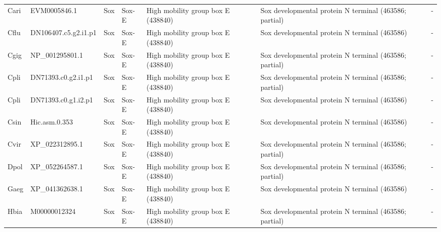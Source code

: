 \documentclass[../main.tex]{subfiles}
\begin{document}
\begin{landscape}
\begin{longtable}{lllllll}
		Cari           & EVM0005846.1          & Sox            & Sox-E               & High mobility group box E (438840)          & Sox developmental protein N terminal (463586; partial)                 & -                    \\
		Cflu           & DN106407.c5.g2.i1.p1  & Sox            & Sox-E               & High mobility group box E (438840)          & Sox developmental protein N terminal (463586)                          & -                    \\
		Cgig           & NP\_001295801.1       & Sox            & Sox-E               & High mobility group box E (438840)          & Sox developmental protein N terminal (463586; partial)                 & -                    \\
		Cpli           & DN71393.c0.g2.i1.p1   & Sox            & Sox-E               & High mobility group box E (438840)          & Sox developmental protein N terminal (463586; partial)                 & -                    \\
		Cpli           & DN71393.c0.g1.i2.p1   & Sox            & Sox-E               & High mobility group box E (438840)          & Sox developmental protein N terminal (463586)                          & -                    \\
		Csin           & Hic.asm.0.353         & Sox            & Sox-E               & High mobility group box E (438840)          & Sox developmental protein N terminal (463586)                          & -                    \\
		Cvir           & XP\_022312895.1       & Sox            & Sox-E               & High mobility group box E (438840)          & Sox developmental protein N terminal (463586; partial)                 & -                    \\
		Dpol           & XP\_052264587.1       & Sox            & Sox-E               & High mobility group box E (438840)          & Sox developmental protein N terminal (463586; partial)                 & -                    \\
		Gaeg           & XP\_041362638.1       & Sox            & Sox-E               & High mobility group box E (438840)          & Sox developmental protein N terminal (463586)                          & -                    \\
		Hbia           & M00000012324          & Sox            & Sox-E               & High mobility group box E (438840)          & Sox developmental protein N terminal (463586; partial)                 & -                    \\

\end{longtable}
\end{landscape}
\end{document}
